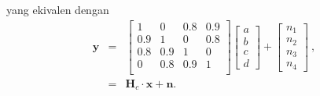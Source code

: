 yang ekivalen dengan
\begin{eqnarray}
\mathbf{y} &=&  \begin{bmatrix}
1   & 0    & 0.8   & 0.9 \\ 
0.9 & 1   & 0   & 0.8    \\ 
0.8 & 0.9 & 1   & 0     \\ 
0   & 0.8 & 0.9 & 1     \\ 
\end{bmatrix}
\begin{bmatrix}
a\\ 
b\\ 
c\\ 
d 
\end{bmatrix}
+ \begin{bmatrix}
n_{1}\\ 
n_{2}\\ 
n_{3}\\ 
n_{4}
\end{bmatrix}~,\\
&=& \mathbf{H}_c\cdot \mathbf{x} + \mathbf{n}.
\end{eqnarray}


